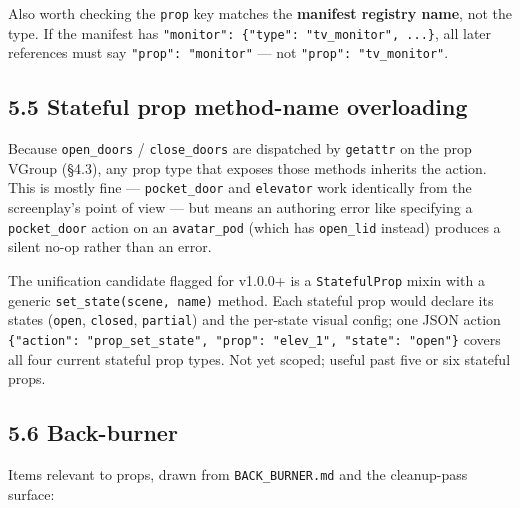 \documentclass[
  11pt,
]{book}
\begin{document}
Also worth checking the \texttt{prop} key matches the \textbf{manifest
registry name}, not the type. If the manifest has
\texttt{"monitor":\ \{"type":\ "tv\_monitor",\ ...\}}, all later
references must say \texttt{"prop":\ "monitor"} --- not
\texttt{"prop":\ "tv\_monitor"}.

\subsection{5.5 Stateful prop method-name
overloading}\label{stateful-prop-method-name-overloading}

Because \texttt{open\_doors} / \texttt{close\_doors} are dispatched by
\texttt{getattr} on the prop VGroup (§4.3), any prop type that exposes
those methods inherits the action. This is mostly fine ---
\texttt{pocket\_door} and \texttt{elevator} work identically from the
screenplay's point of view --- but means an authoring error like
specifying a \texttt{pocket\_door} action on an \texttt{avatar\_pod}
(which has \texttt{open\_lid} instead) produces a silent no-op rather
than an error.

The unification candidate flagged for v1.0.0+ is a \texttt{StatefulProp}
mixin with a generic \texttt{set\_state(scene,\ name)} method. Each
stateful prop would declare its states (\texttt{open}, \texttt{closed},
\texttt{partial}) and the per-state visual config; one JSON action
\texttt{\{"action":\ "prop\_set\_state",\ "prop":\ "elev\_1",\ "state":\ "open"\}}
covers all four current stateful prop types. Not yet scoped; useful past
five or six stateful props.

\subsection{5.6 Back-burner}\label{back-burner}

Items relevant to props, drawn from \texttt{BACK\_BURNER.md} and the
cleanup-pass surface:
\end{document}

